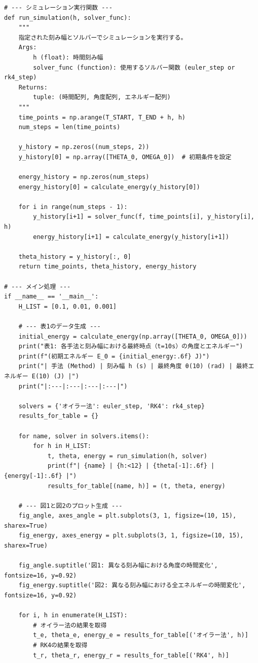 \documentclass{article}
\begin{document}
\begin{lstlisting}[caption={Python code used for numerical experiments, tables, and graphs in this study}, label={lst:code}]
# --- シミュレーション実行関数 ---
def run_simulation(h, solver_func):
    """
    指定された刻み幅とソルバーでシミュレーションを実行する。
    Args:
        h (float): 時間刻み幅
        solver_func (function): 使用するソルバー関数 (euler_step or rk4_step)
    Returns:
        tuple: (時間配列, 角度配列, エネルギー配列)
    """
    time_points = np.arange(T_START, T_END + h, h)
    num_steps = len(time_points)
    
    y_history = np.zeros((num_steps, 2))
    y_history[0] = np.array([THETA_0, OMEGA_0])  # 初期条件を設定
    
    energy_history = np.zeros(num_steps)
    energy_history[0] = calculate_energy(y_history[0])
    
    for i in range(num_steps - 1):
        y_history[i+1] = solver_func(f, time_points[i], y_history[i], h)
        energy_history[i+1] = calculate_energy(y_history[i+1])
        
    theta_history = y_history[:, 0]
    return time_points, theta_history, energy_history

# --- メイン処理 ---
if __name__ == '__main__':
    H_LIST = [0.1, 0.01, 0.001]
    
    # --- 表1のデータ生成 ---
    initial_energy = calculate_energy(np.array([THETA_0, OMEGA_0]))
    print("表1: 各手法と刻み幅における最終時点（t=10s）の角度とエネルギー")
    print(f"(初期エネルギー E_0 = {initial_energy:.6f} J)")
    print("| 手法 (Method) | 刻み幅 h (s) | 最終角度 θ(10) (rad) | 最終エネルギー E(10) (J) |")
    print("|:---|:---|:---|:---|")
    
    solvers = {'オイラー法': euler_step, 'RK4': rk4_step}
    results_for_table = {}

    for name, solver in solvers.items():
        for h in H_LIST:
            t, theta, energy = run_simulation(h, solver)
            print(f"| {name} | {h:<12} | {theta[-1]:.6f} | {energy[-1]:.6f} |")
            results_for_table[(name, h)] = (t, theta, energy)

    # --- 図1と図2のプロット生成 ---
    fig_angle, axes_angle = plt.subplots(3, 1, figsize=(10, 15), sharex=True)
    fig_energy, axes_energy = plt.subplots(3, 1, figsize=(10, 15), sharex=True)
    
    fig_angle.suptitle('図1: 異なる刻み幅における角度の時間変化', fontsize=16, y=0.92)
    fig_energy.suptitle('図2: 異なる刻み幅における全エネルギーの時間変化', fontsize=16, y=0.92)

    for i, h in enumerate(H_LIST):
        # オイラー法の結果を取得
        t_e, theta_e, energy_e = results_for_table[('オイラー法', h)]
        # RK4の結果を取得
        t_r, theta_r, energy_r = results_for_table[('RK4', h)]
        

\end{lstlisting}
\end{document}
